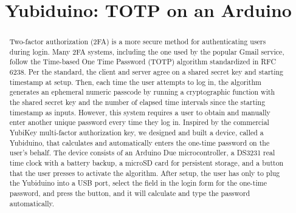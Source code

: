 \documentclass[conference]{IEEEtran}
\begin{document}
%
\title{Yubiduino: TOTP on an Arduino}


\author{
}

\maketitle


\begin{abstract}
Two-factor authorization (2FA) is a more secure method for authenticating users during login. Many 2FA systems, including the one used by the popular Gmail service, follow the Time-based One Time Password (TOTP) algorithm standardized in RFC 6238. Per the standard, the client and server agree on a shared secret key and starting timestamp at setup. Then, each time the user attempts to log in, the algorithm generates an ephemeral numeric passcode by running a cryptographic function with the shared secret key and the number of elapsed time intervals since the starting timestamp as inputs. However, this system requires a user to obtain and manually enter another unique password every time they log in. Inspired by the commercial YubiKey multi-factor authorization key, we designed and built a device, called a Yubiduino, that calculates and automatically enters the one-time password on the user's behalf. The device consists of an Arduino Due microcontroller, a DS3231 real time clock with a battery backup, a microSD card for persistent storage, and a button that the user presses to activate the algorithm. After setup, the user has only to plug the Yubiduino into a USB port, select the field in the login form for the one-time password, and press the button, and it will calculate and type the password automatically.

\end{abstract}
\end{document}
